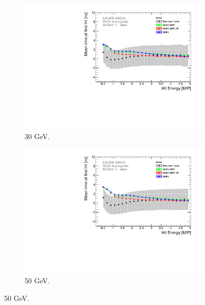 
\begin{figure}[htbp!]
  \begin{subfigure}[t]{0.49\textwidth}
    \centering
    \includegraphics[width=1\textwidth]{../Thesis_Plots/Timing/Pions/Plots/ComparisonToSim/Time_Energy_30GeV_Mokka.pdf}
    \caption{30 GeV.}\label{fig:Energy_SimData_30GeV}
  \end{subfigure}
  \hfill
  \begin{subfigure}[t]{0.49\textwidth}
    \centering
    \includegraphics[width=1\textwidth]{../Thesis_Plots/Timing/Pions/Plots/ComparisonToSim/Time_Energy_50GeV_Mokka.pdf}
    \caption{50 GeV.} \label{fig:Energy_SimData_50GeV}
  \end{subfigure}

\end{figure}
